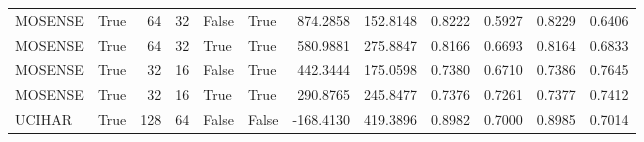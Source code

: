 \documentclass{article}
\begin{document}
\begin{tabular}{llrrllrrrrrr}
	MOSENSE &    True &      64 &      32 &    False &   True &  874.2858 &  152.8148 &   0.8222 &   0.5927 &   0.8229 &   0.6406 \\
	MOSENSE &    True &      64 &      32 &     True &   True &  580.9881 &  275.8847 &   0.8166 &   0.6693 &   0.8164 &   0.6833 \\
	MOSENSE &    True &      32 &      16 &    False &   True &  442.3444 &  175.0598 &   0.7380 &   0.6710 &   0.7386 &   0.7645 \\
	MOSENSE &    True &      32 &      16 &     True &   True &  290.8765 &  245.8477 &   0.7376 &   0.7261 &   0.7377 &   0.7412 \\
	UCIHAR &    True &     128 &      64 &    False &  False & -168.4130 &  419.3896 &   0.8982 &   0.7000 &   0.8985 &   0.7014 \\
	\bottomrule
\end{tabular}
\end{document}
